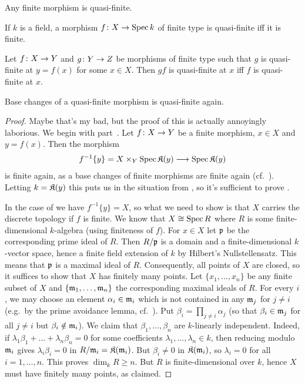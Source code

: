 \documentclass[a4paper,parskip=half,numbers=enddot, DIV=12]{scrreprt}
\renewcommand{\geq}{\geqslant}
\begin{document}
\begin{fact}
	\begin{alphanumerate}
		\item {}Any finite morphism is quasi-finite.
		\item If $k$ is a field, a morphism $f\colon X\morphism\Spec k$ of finite type is quasi-finite iff it is finite.
		\item Let $f\colon X\morphism Y$ and $g\colon Y\morphism Z$ be morphisms of finite type such that $g$ is quasi-finite at $y=f(x)$ for some $x\in X$. Then $gf$ is quasi-finite at $x$ iff $f$ is quasi-finite at $x$.
		\item Base changes of a quasi-finite morphism is quasi-finite again.
	\end{alphanumerate}
\end{fact}
\begin{proof}
	Maybe that's my bad, but the proof of this is actually annoyingly laborious. We begin with part~. Let $f\colon X\morphism Y$ be a finite morphism, $x\in X$ and $y=f(x)$. Then the morphism
	\begin{align*}
		f^{-1}\{y\}=X\times_Y\Spec \KK(y)\morphism \Spec \KK(y)
	\end{align*}
	is finite again, as a base changes of finite morphisms are finite again (cf.\ \cite[Corollary~1.5.1]{alggeo1}). Letting $k=\mathfrak{K}(y)$ this puts us in the situation from , so it's sufficient to prove .
	
	In the case of  we have $f^{-1}\{y\}=X$, so what we need to show is that $X$ carries the discrete topology if $f$ is finite. We know that $X\cong \operatorname{Spec} R$ where $R$ is some finite-dimensional $k$-algebra (using finiteness of $f$). For $x\in X$ let $\mathfrak{p}$ be the corresponding prime ideal of $R$. Then $R/\mathfrak{p}$ is a domain and a finite-dimensional $k$-vector space, hence a finite field extension of $k$ by Hilbert's Nullstellensatz. This means that $\mathfrak{p}$ is a maximal ideal of $R$. Consequently, all points of $X$ are closed, so it suffices to show that $X$ has finitely many points. Let $\{x_1,\ldots,x_n\}$ be any finite subset of $X$ and $\{\mathfrak{m}_1,\ldots,\mathfrak{m}_n\}$ the corresponding maximal ideals of $R$. For every $i$, we may choose an element $\alpha_i\in\mathfrak{m}_i$ which is not contained in any $\mathfrak{m}_j$ for $j\neq i$ (e.g.\ by the prime avoidance lemma, cf.\ \cite[Lemma~2.5.1]{alg1}). Put $\beta_i=\prod_{j\neq i}\alpha_j$ (so that $\beta_i\in\mathfrak{m}_j$ for all $j\neq i$ but $\beta_i\notin \mathfrak{m}_i$). We claim that $\beta_1,\ldots,\beta_n$ are $k$-linearly independent. Indeed, if $\lambda_1\beta_1+\ldots+\lambda_n\beta_n=0$ for some coefficients $\lambda_1,\ldots,\lambda_n\in k$, then reducing modulo $\mathfrak{m}_i$ gives $\lambda_i\beta_i=0$ in $R/\mathfrak{m}_i=\mathfrak{K}(\mathfrak{m}_i)$. But $\beta_i\neq 0$ in $\mathfrak{K}(\mathfrak{m}_i)$, so $\lambda_i=0$ for all $i=1,\ldots,n$. This proves $\dim_kR\geq n$. But $R$ is finite-dimensional over $k$, hence $X$ must have finitely many points, as claimed.
	

\end{proof}
\end{document}
